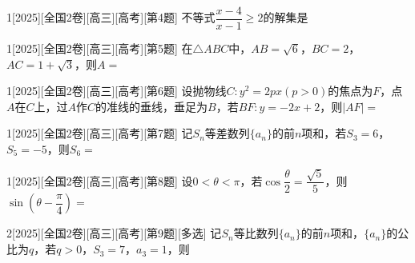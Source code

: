 \begin{example}{1}[2025][全国2卷][高三][高考][第4题]
不等式$\dfrac{x-4}{x-1}\ge 2$的解集是\blankbox
\begin{choices}
\end{choices}

\end{example}

\begin{example}{1}[2025][全国2卷][高三][高考][第5题]
在$\triangle ABC$中，$AB=\sqrt{6}$，$BC=2$，$AC=1+\sqrt{3}$，则$A=$\blankbox
\begin{choices}
\end{choices}

\end{example}

\begin{example}{1}[2025][全国2卷][高三][高考][第6题]
设抛物线$C:y^2=2px(p>0)$的焦点为$F$，点$A$在$C$上，过$A$作$C$的准线的垂线，垂足为$B$，若$BF:y=-2x+2$，则$|AF|=$\blankbox
\begin{choices}
\end{choices}
\end{example}

\begin{example}{1}[2025][全国2卷][高三][高考][第7题]
记$S_n$等差数列$\{a_n\}$的前$n$项和，若$S_3=6$，$S_5=-5$，则$S_6=$\blankbox
\begin{choices}
\end{choices}
\end{example}

\begin{example}{1}[2025][全国2卷][高三][高考][第8题]
设$0<\theta<\pi$，若$\cos\dfrac{\theta}{2}=\dfrac{\sqrt{5}}{5}$，则$\sin\left(\theta-\dfrac{\pi}{4}\right)=$\blankbox
\begin{choices}
\end{choices}
\end{example}
\begin{example}{2}[2025][全国2卷][高三][高考][第9题][多选]
记$S_n$等比数列$\{a_n\}$的前$n$项和，$\{a_n\}$的公比为$q$，若$q>0$，$S_3=7$，$a_3=1$，则\blankbox
\begin{choices}
\end{choices}
\end{example}

